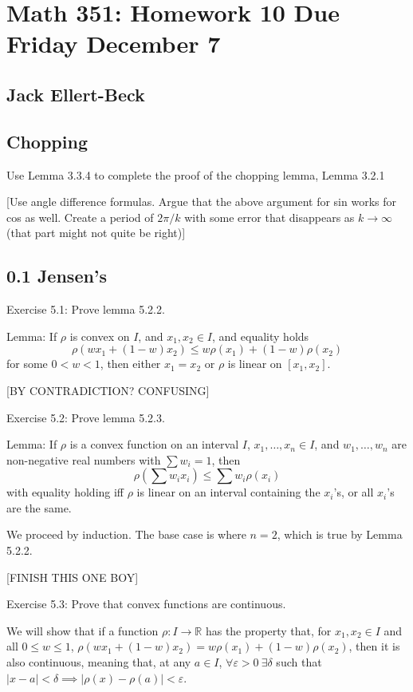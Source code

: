 \documentclass[11pt]{article}
\newcommand{\R}{\mathbb{R}}
\begin{document}
\setlength{\parindent}{0pt}
\setlength{\parskip}{9pt}


\section*{Math 351: Homework 10  Due Friday December 7}
\subsection*{Jack Ellert-Beck}

\bigskip

\subsection*{Chopping}

Use Lemma 3.3.4 to complete the proof of the chopping lemma, Lemma 3.2.1

[Use angle difference formulas. Argue that the above argument for sin works
for cos as well. Create a period of $2\pi/k$ with some error that
disappears as $k\to\infty$ (that part might not quite be right)]

\subsection*{0.1 Jensen's}

Exercise 5.1: Prove lemma 5.2.2.

Lemma: If $\rho$ is convex on $I$, and $x_1,x_2\in I$, and equality holds
\[
    \rho(wx_1+(1-w)x_2)\leq w\rho(x_1)+(1-w)\rho(x_2)
\]
for some $0<w<1$, then either $x_1=x_2$ or $\rho$ is linear on $[x_1,x_2]$.

[BY CONTRADICTION? CONFUSING]

Exercise 5.2: Prove lemma 5.2.3.

Lemma: If $\rho$ is a convex function on an interval $I$,
$x_1,\ldots,x_n\in I$,
and $w_1,\ldots,w_n$ are non-negative real numbers with $\sum w_i=1$, then
\[
    \rho\left(\sum w_ix_i\right)\leq\sum w_i\rho(x_i)
\]
with equality holding iff $\rho$ is linear on an interval containing the
$x_i$'s, or all $x_i$'s are the same.

We proceed by induction. The base case is where $n=2$, which is true by
Lemma 5.2.2.

[FINISH THIS ONE BOY]

Exercise 5.3: Prove that convex functions are continuous.

We will show that if a function $\rho:I\to\R$ has the property that, for
$x_1,x_2\in I$ and all $0\leq w\leq1$,
$\rho(wx_1+(1-w)x_2)=w\rho(x_1)+(1-w)\rho(x_2)$,
then it is also continuous, meaning that, at any $a\in I$,
$\forall \varepsilon>0\ \exists\delta$ such that
$|x-a|<\delta\implies|\rho(x)-\rho(a)|<\varepsilon$.
\end{document}
